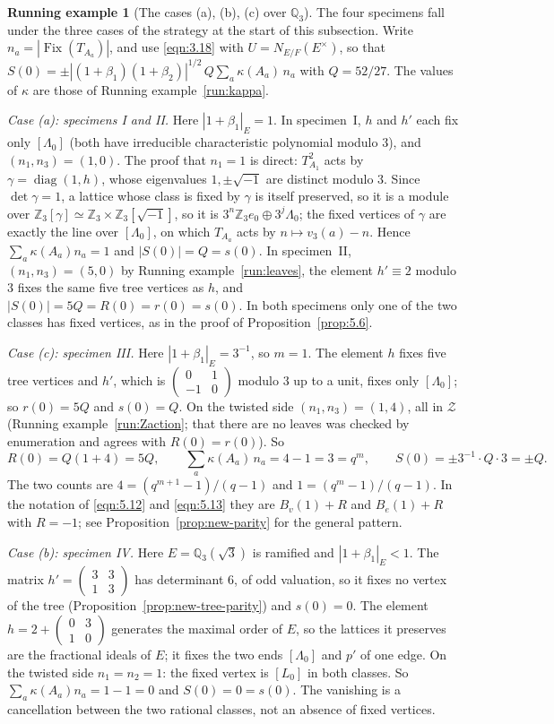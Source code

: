 \documentclass[12pt,letterpaper]{amsart}
\numberwithin{equation}{section}
\theoremstyle{definition}
\newtheorem{runex}[theorem]{Running example}
\theoremstyle{plain}
\newcommand{\smat}[4]{\left(\begin{smallmatrix}#1&#2\\#3&#4\end{smallmatrix}\right)}
\begin{document}
\begin{runex}[The cases (a), (b), (c) over $\mathbb Q_3$]
\label{run:case-split}
The four specimens fall under the three cases of the strategy at the
start of this subsection. Write $n_a=|\operatorname{Fix}(T_{A_a})|$,
and use \eqref{eqn:3.18} with $U=N_{E/F}(E^\times)$, so that
$S(0)=\pm|(1+\beta_1)(1+\beta_2)|^{1/2}\,Q\sum_a\kappa(A_a)\,n_a$ with
$Q=52/27$. The values of $\kappa$ are those of
Running example~\ref{run:kappa}.

\emph{Case (a): specimens I and II.} Here $|1+\beta_1|_E=1$. In
specimen~I, $h$ and $h'$ each fix only $[\Lambda_0]$ (both have
irreducible characteristic polynomial modulo $3$), and
$(n_1,n_3)=(1,0)$. The proof that $n_1=1$ is direct:
$T_{A_1}^2$ acts by $\gamma=\operatorname{diag}(1,h)$, whose
eigenvalues $1,\pm\sqrt{-1}$ are distinct modulo $3$. Since
$\det\gamma=1$, a lattice whose class is fixed by $\gamma$ is itself
preserved, so it is a module over
$\mathbb Z_3[\gamma]\simeq\mathbb Z_3\times\mathbb Z_3[\sqrt{-1}]$, so
it is $3^n\mathbb Z_3e_0\oplus3^j\Lambda_0$; the fixed vertices of
$\gamma$ are exactly the line over $[\Lambda_0]$, on which $T_{A_a}$
acts by $n\mapsto v_3(a)-n$. Hence $\sum_a\kappa(A_a)n_a=1$ and
$|S(0)|=Q=s(0)$. In specimen~II, $(n_1,n_3)=(5,0)$ by
Running example~\ref{run:leaves}, the element $h'\equiv2$ modulo $3$
fixes the same five tree vertices as $h$, and
$|S(0)|=5Q=R(0)=r(0)=s(0)$. In both specimens only one of the two
classes has fixed vertices, as in the proof of
Proposition~\ref{prop:5.6}.

\emph{Case (c): specimen III.} Here $|1+\beta_1|_E=3^{-1}$, so $m=1$.
The element $h$ fixes five tree vertices and $h'$, which is
$\smat{0}{1}{-1}{0}$ modulo $3$ up to a unit, fixes only
$[\Lambda_0]$; so $r(0)=5Q$ and $s(0)=Q$. On the twisted side
$(n_1,n_3)=(1,4)$, all in $\mathcal Z$
(Running example~\ref{run:Zaction}; that there are no leaves was
checked by enumeration and agrees with $R(0)=r(0)$). So
\[
 R(0)=Q(1+4)=5Q,\qquad
 \sum_a\kappa(A_a)\,n_a=4-1=3=q^m,\qquad
 S(0)=\pm3^{-1}\cdot Q\cdot3=\pm Q .
\]
The two counts are $4=(q^{m+1}-1)/(q-1)$ and $1=(q^m-1)/(q-1)$. In the
notation of \eqref{eqn:5.12} and \eqref{eqn:5.13} they are
$B_v(1)+R$ and $B_e(1)+R$ with $R=-1$; see
Proposition~\ref{prop:new-parity} for the general pattern.

\emph{Case (b): specimen IV.} Here $E=\mathbb Q_3(\sqrt3)$ is
ramified and $|1+\beta_1|_E<1$. The matrix $h'=\smat{3}{3}{1}{3}$ has
determinant $6$, of odd valuation, so it fixes no vertex of the tree
(Proposition~\ref{prop:new-tree-parity}) and $s(0)=0$. The element
$h=2+\smat{0}{3}{1}{0}$ generates the maximal order of $E$, so the
lattices it preserves are the fractional ideals of $E$; it fixes the
two ends $[\Lambda_0]$ and $p'$ of one edge. On the twisted side
$n_1=n_2=1$: the fixed vertex is $[L_0]$ in both classes. So
$\sum_a\kappa(A_a)n_a=1-1=0$ and $S(0)=0=s(0)$. The vanishing is a
cancellation between the two rational classes, not an absence of
fixed vertices.
\end{runex}
\end{document}
